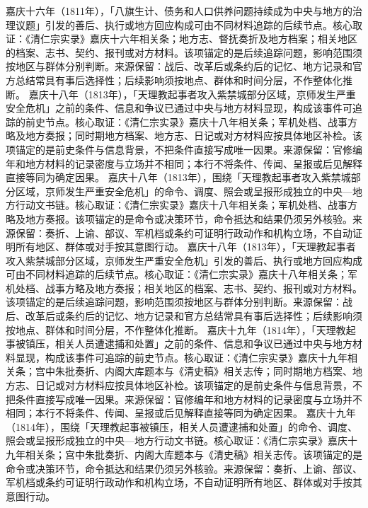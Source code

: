 嘉庆十六年（1811年），「八旗生计、债务和人口供养问题持续成为中央与地方的治理议题」引发的善后、执行或地方回应构成可由不同材料追踪的后续节点。核心取证：《清仁宗实录》嘉庆十六年相关条；地方志、督抚奏折及地方档案；相关地区的档案、志书、契约、报刊或对方材料。该项锚定的是后续追踪问题，影响范围须按地区与群体分别判断。来源保留：战后、改革后或条约后的记忆、地方记录和官方总结常具有事后选择性；后续影响须按地点、群体和时间分层，不作整体化推断。
嘉庆十八年（1813年），「天理教起事者攻入紫禁城部分区域，京师发生严重安全危机」之前的条件、信息和争议已通过中央与地方材料显现，构成该事件可追踪的前史节点。核心取证：《清仁宗实录》嘉庆十八年相关条；军机处档、战事方略及地方奏报；同时期地方档案、地方志、日记或对方材料应按具体地区补检。该项锚定的是前史条件与信息背景，不把条件直接写成唯一因果。来源保留：官修编年和地方材料的记录密度与立场并不相同；本行不将条件、传闻、呈报或后见解释直接等同为确定因果。
嘉庆十八年（1813年），围绕「天理教起事者攻入紫禁城部分区域，京师发生严重安全危机」的命令、调度、照会或呈报形成独立的中央—地方行动文书链。核心取证：《清仁宗实录》嘉庆十八年相关条；军机处档、战事方略及地方奏报。该项锚定的是命令或决策环节，命令抵达和结果仍须另外核验。来源保留：奏折、上谕、部议、军机档或条约可证明行政动作和机构立场，不自动证明所有地区、群体或对手按其意图行动。
嘉庆十八年（1813年），「天理教起事者攻入紫禁城部分区域，京师发生严重安全危机」引发的善后、执行或地方回应构成可由不同材料追踪的后续节点。核心取证：《清仁宗实录》嘉庆十八年相关条；军机处档、战事方略及地方奏报；相关地区的档案、志书、契约、报刊或对方材料。该项锚定的是后续追踪问题，影响范围须按地区与群体分别判断。来源保留：战后、改革后或条约后的记忆、地方记录和官方总结常具有事后选择性；后续影响须按地点、群体和时间分层，不作整体化推断。
嘉庆十九年（1814年），「天理教起事被镇压，相关人员遭逮捕和处置」之前的条件、信息和争议已通过中央与地方材料显现，构成该事件可追踪的前史节点。核心取证：《清仁宗实录》嘉庆十九年相关条；宫中朱批奏折、内阁大库题本与《清史稿》相关志传；同时期地方档案、地方志、日记或对方材料应按具体地区补检。该项锚定的是前史条件与信息背景，不把条件直接写成唯一因果。来源保留：官修编年和地方材料的记录密度与立场并不相同；本行不将条件、传闻、呈报或后见解释直接等同为确定因果。
嘉庆十九年（1814年），围绕「天理教起事被镇压，相关人员遭逮捕和处置」的命令、调度、照会或呈报形成独立的中央—地方行动文书链。核心取证：《清仁宗实录》嘉庆十九年相关条；宫中朱批奏折、内阁大库题本与《清史稿》相关志传。该项锚定的是命令或决策环节，命令抵达和结果仍须另外核验。来源保留：奏折、上谕、部议、军机档或条约可证明行政动作和机构立场，不自动证明所有地区、群体或对手按其意图行动。

